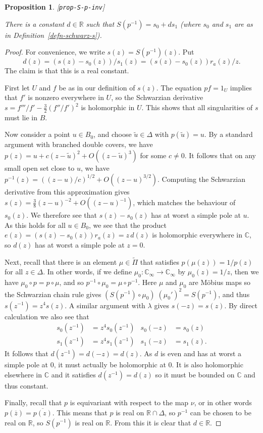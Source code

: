 \documentclass[reqno]{amsart}
\newcommand{\lbl}[1]{\label{#1}\textup{[\texttt{#1}]}\par}
\newcommand{\lbl}{\label}
\newcommand{\Dl}        {\Delta}
\newcommand{\lm}        {\lambda}
\newcommand{\R}         {{\mathbb{R}}}
\newcommand{\C}         {{\mathbb{C}}}
\newcommand{\ov}[1]     {\overline{#1}}
\newcommand{\tu}	{\widetilde{u}}
\newcommand{\tPi}	{\widetilde{\Pi}}
\renewcommand{\:}{\colon}
\newtheorem{proposition}[theorem]{Proposition}
\theoremstyle{definition}
\begin{document}
\begin{proposition}\lbl{prop-S-p-inv}
 There is a constant $d\in\R$ such that $S(p^{-1})=s_0+ds_1$ (where
 $s_0$ and $s_1$ are as in Definition~\ref{defn-schwarz-s}).
\end{proposition}
\begin{proof}
 For convenience, we write $s(z)=S(p^{-1})(z)$.  Put
 \[ d(z)=(s(z)-s_0(z))/s_1(z)=(s(z)-s_0(z))r_a(z)/z. \]
 The claim is that this is a real constant.

 First let $U$ and $f$ be as in our definition of $s(z)$.  The
 equation $pf=1_U$ implies that $f'$ is nonzero everywhere in $U$, so
 the Schwarzian derivative $s=f'''/f'-\tfrac{3}{2}(f''/f')^2$ is
 holomorphic in $U$.  This shows that all singularities of $s$ must
 lie in $B$.

 Now consider a point $u\in B_0$, and choose $\tu\in\Dl$ with
 $p(\tu)=u$.  By a standard argument with branched double covers, we
 have $p(z)=u+c(z-\tu)^2+O((z-\tu)^3)$ for some $c\neq 0$.  It follows
 that on any small open set close to $u$, we have
 $p^{-1}(z)=((z-u)/c)^{1/2}+O((z-u)^{3/2})$.  Computing the
 Schwarzian derivative from this approximation gives
 $s(z)=\tfrac{3}{8}(z-u)^{-2}+O((z-u)^{-1})$, which matches the
 behaviour of $s_0(z)$.  We therefore see that $s(z)-s_0(z)$ has at
 worst a simple pole at $u$.  As this holds for all $u\in B_0$, we see
 that the product $e(z)=(s(z)-s_0(z))r_a(z)=z\,d(z)$ is holomorphic
 everywhere in $\C$, so $d(z)$ has at worst a simple pole at $z=0$.

 Next, recall that there is an element $\mu\in\tPi$ that satisfies
 $p(\mu(z))=1/p(z)$ for all $z\in\Dl$.  In other words, if we define
 $\mu_0\:\C_\infty\to\C_\infty$ by $\mu_0(z)=1/z$, then we have
 $\mu_0\circ p=p\circ\mu$, and so $p^{-1}\circ\mu_0=\mu\circ p^{-1}$.
 Here $\mu$ and $\mu_0$ are M\"obius maps so the Schwarzian chain
 rule gives $(S(p^{-1})\circ\mu_0)\;(\mu_0')^2=S(p^{-1})$, and thus
 $s(z^{-1})=z^4s(z)$.  A similar argument with $\lm$ gives
 $s(-z)=s(z)$.  By direct calculation we also see that
 \begin{align*}
  s_0(z^{-1}) &= z^4s_0(z^{-1}) & s_0(-z) &= s_0(z) \\
  s_1(z^{-1}) &= z^4s_1(z^{-1}) & s_1(-z) &= s_1(z).
 \end{align*}
 It follows that $d(z^{-1})=d(-z)=d(z)$.  As $d$ is even and has at
 worst a simple pole at $0$, it must actually be holomorphic at $0$.
 It is also holomorphic elsewhere in $\C$ and it satisfies
 $d(z^{-1})=d(z)$ so it must be bounded on $\C$ and thus constant.

 Finally, recall that $p$ is equivariant with respect to the map
 $\nu$, or in other words $p(\ov{z})=\ov{p(z)}$.  This means that $p$
 is real on $\R\cap\Dl$, so $p^{-1}$ can be chosen to be real on $\R$,
 so $S(p^{-1})$ is real on $\R$.  From this it is clear that $d\in\R$.
\end{proof}
\end{document}
